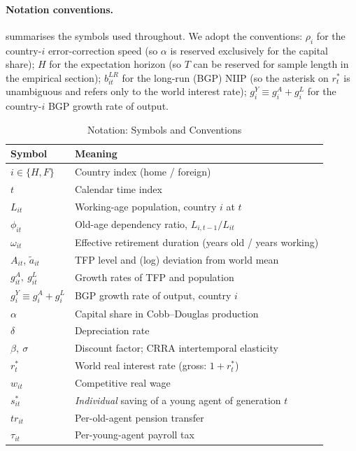 \paragraph{Notation conventions.}  summarises the symbols
used throughout. We adopt the conventions: $\rho_i$ for the country-$i$
error-correction speed (so $\alpha$ is reserved exclusively for the capital
share); $H$ for the expectation horizon (so $T$ can be reserved for sample
length in the empirical section); $b_{it}^{LR}$ for the long-run (BGP) NIIP
(so the asterisk on $r_t^*$ is unambiguous and refers only to the world
interest rate); $g_i^Y \equiv g_i^A + g_i^L$ for the country-$i$ BGP growth
rate of output.

\begin{table}[t]
\centering
\caption{Notation: Symbols and Conventions}\label{tab:notation}
\begin{threeparttable}
\begin{tabular}{ll}
\toprule
Symbol & Meaning \\
\midrule
$i\in\{H,F\}$ & Country index (home / foreign) \\
$t$ & Calendar time index \\
$L_{it}$ & Working-age population, country $i$ at $t$ \\
$\phi_{it}$ & Old-age dependency ratio, $L_{i,t-1}/L_{it}$ \\
$\omega_{it}$ & Effective retirement duration (years old / years working) \\
$A_{it}$, $\tilde a_{it}$ & TFP level and (log) deviation from world mean \\
$g_{it}^A,\ g_{it}^L$ & Growth rates of TFP and population \\
$g_i^Y \equiv g_i^A+g_i^L$ & BGP growth rate of output, country $i$ \\
$\alpha$ & Capital share in Cobb--Douglas production \\
$\delta$ & Depreciation rate \\
$\beta,\ \sigma$ & Discount factor; CRRA intertemporal elasticity \\
$r_t^*$ & World real interest rate (gross: $1+r_t^*$) \\
$w_{it}$ & Competitive real wage \\
$s_{it}^*$ & \emph{Individual} saving of a young agent of generation $t$ \\
$tr_{it}$ & Per-old-agent pension transfer \\
$\tau_{it}$ & Per-young-agent payroll tax \\

\end{tabular}
\end{threeparttable}
\end{table}
